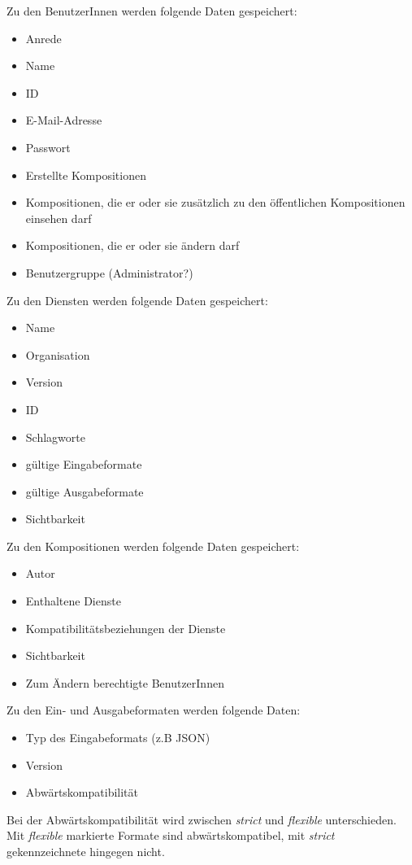 Zu den BenutzerInnen werden folgende Daten gespeichert:
\begin{itemize}
	\item Anrede
	\item Name
	\item ID
	\item E-Mail-Adresse
	\item Passwort
	\item Erstellte Kompositionen
	\item Kompositionen, die er oder sie zusätzlich zu den öffentlichen Kompositionen einsehen darf
	\item Kompositionen, die er oder sie ändern darf
	\item Benutzergruppe (Administrator?)
\end{itemize}
Zu den Diensten werden folgende Daten gespeichert:
\begin{itemize}
	\item Name
	\item Organisation
	\item Version
	\item ID
	\item Schlagworte
	\item gültige Eingabeformate
	\item gültige Ausgabeformate
	\item Sichtbarkeit
\end{itemize}
Zu den Kompositionen werden folgende Daten gespeichert:
\begin{itemize}
	\item Autor
	\item Enthaltene Dienste
	\item Kompatibilitätsbeziehungen der Dienste
	\item Sichtbarkeit
	\item Zum Ändern berechtigte BenutzerInnen
\end{itemize}

Zu den Ein- und Ausgabeformaten werden folgende Daten:
\begin{itemize}
	\item Typ des Eingabeformats (z.B JSON)
	\item Version
	\item Abwärtskompatibilität
\end{itemize}
Bei der Abwärtskompatibilität wird zwischen \textit{strict} und \textit{flexible} unterschieden. Mit \textit{flexible} markierte Formate sind abwärtskompatibel, mit \textit{strict} gekennzeichnete hingegen nicht.
